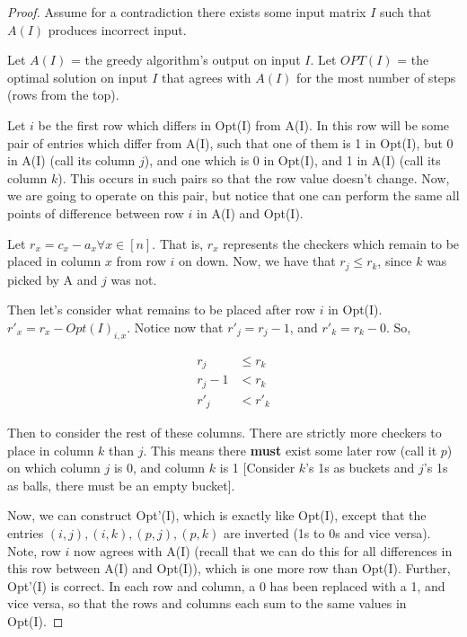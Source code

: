 \documentclass{article}
\begin{document}
	\begin{proof}
	Assume for a contradiction there exists some input matrix $I$ such that $A(I)$ produces incorrect input.
	
	Let $A(I)$ = the greedy algorithm's output on input $I$.
	Let $OPT(I)$ = the optimal solution on input $I$ that agrees
	with $A(I)$ for the most number of steps (rows from the top).
 	
    Let $i$ be the first row which differs in Opt(I) from A(I).
    In this row will be some pair of entries which differ from A(I), such that one of them is 1 in Opt(I), but 0 in A(I) (call its column $j$), and one which is 0 in Opt(I), and 1 in A(I) (call its column $k$).
    This occurs in such pairs so that the row value doesn't change.
    Now, we are going to operate on this pair, but notice that one can perform the same all points of difference between row $i$ in A(I) and Opt(I).
    
    Let $r_x = c_x - a_x \forall x \in [n]$. That is, $r_x$ represents the checkers which remain to be placed in column $x$ from row $i$ on down.
    Now, we have that $r_j \leq r_k$, since $k$ was picked by A and $j$ was not.
    
    Then let's consider what remains to be placed after row $i$ in Opt(I).
    $r'_x = r_x - Opt(I)_{i, x}$.
    Notice now that $r'_j = r_j - 1$, and $r'_k = r_k - 0$. So,
    
    \begin{align*}
    r_j &\leq r_k\\
    r_j - 1 &< r_k\\
    r'_j &< r'_k
    \end{align*}
    
    Then to consider the rest of these columns.
    There are strictly more checkers to place in column $k$ than $j$.
    This means there \textbf{must} exist some later row (call it $p$) on which column $j$ is 0, and column $k$ is 1 [Consider $k$'s 1s as buckets and $j$'s 1s as balls, there must be an empty bucket].
    
    Now, we can construct Opt'(I), which is exactly like Opt(I), except that the entries $(i, j), (i, k), (p, j), (p, k)$ are inverted (1s to 0s and vice versa).
    Note, row $i$ now agrees with A(I) (recall that we can do this for all differences in this row between A(I) and Opt(I)), which is one more row than Opt(I).
    Further, Opt'(I) is correct.
    In each row and column, a 0 has been replaced with a 1, and vice versa, so that the rows and columns each sum to the same values in Opt(I).
    

\end{proof}
\end{document}
